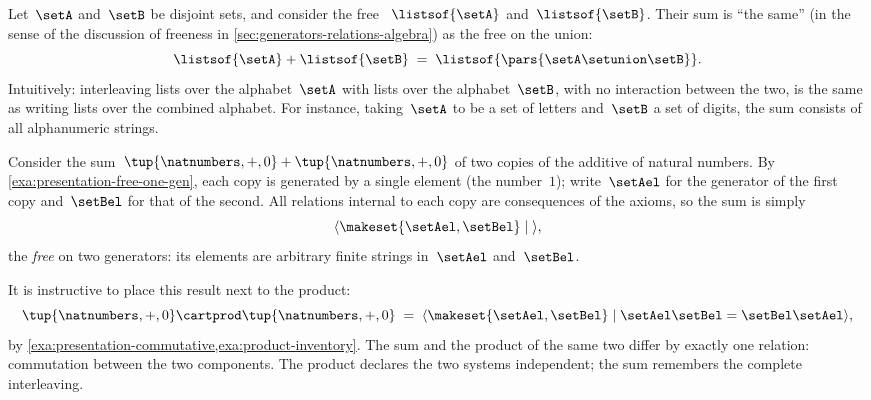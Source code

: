 \begin{example}
    \label{exa:sum-free-monoids}
    Let~$\setA$ and~$\setB$ be disjoint sets, and consider the free ~$\listsof{\setA}$ and~$\listsof{\setB}$.
    Their sum is ``the same'' (in the sense of the discussion of freeness in \cref{sec:generators-relations-algebra}) as the free  on the union:
    \begin{equation}
        \listsof{\setA} + \listsof{\setB} \; = \; \listsof{\pars{\setA \setunion \setB}}.
    \end{equation}
    Intuitively: interleaving lists over the alphabet~$\setA$ with lists over the alphabet~$\setB$, with no interaction between the two, is the same as writing lists over the combined alphabet.
    For instance, taking~$\setA$ to be a set of letters and~$\setB$ a set of digits, the sum consists of all alphanumeric strings.
\end{example}

\begin{example}
    \label{exa:sum-two-copies-nat}
    Consider the sum~$\tup{\natnumbers, +, 0} + \tup{\natnumbers, +, 0}$ of two copies of the additive  of natural numbers.
    By \cref{exa:presentation-free-one-gen}, each copy is generated by a single element (the number~$1$); write~$\setAel$ for the generator of the first copy and~$\setBel$ for that of the second.
    All relations internal to each copy are consequences of the  axioms, so the sum is simply
    \begin{equation}
        \langle \makeset{\setAel, \setBel} \mid \; \rangle,
    \end{equation}
    the \emph{free}  on two generators: its elements are arbitrary finite strings in~$\setAel$ and~$\setBel$.

    It is instructive to place this result next to the product:
    \begin{equation}
        \tup{\natnumbers, +, 0} \cartprod \tup{\natnumbers, +, 0}
        \; = \;
        \langle \makeset{\setAel, \setBel} \mid \setAel\setBel = \setBel\setAel \rangle,
    \end{equation}
    by \cref{exa:presentation-commutative,exa:product-inventory}.
    The sum and the product of the same two  differ by exactly one relation: commutation between the two components.
    The product declares the two systems independent; the sum remembers the complete interleaving.
\end{example}

